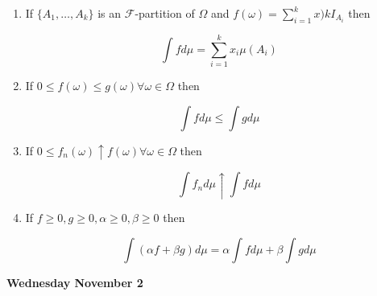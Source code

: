 \documentclass[11pt,fleqn]{book} %
\begin{document}
\begin{theorem}
	\begin{enumerate}
		\item If $\{A_1, \dots, A_k\}$ is an $\mathcal{F}$-partition of $\Omega$ and $f(\omega) = \sum^k_{i=1} x)k I_{A_i}$  then

				$$\int f d \mu = \sum^k_{i = 1} x_i \mu(A_i) $$
		
		\item If $0 \leq f(\omega) \leq g(\omega) \forall \omega\in \Omega$ then

				$$\int f d\mu \leq \int g d \mu $$ 
		\item If $0 \leq f_n(\omega) \uparrow f(\omega) \forall \omega \in \Omega$ then

				$$\int f_n d\mu \uparrow \int f d\mu $$ 
		\item If $f \geq 0, g \geq 0, \alpha \geq 0, \beta \geq 0$ then

				$$\int (\alpha f + \beta g)d\mu = \alpha \int f d\mu + \beta \int g d\mu $$
	\end{enumerate}
\end{theorem}

\textbf{Wednesday November 2}\\
\end{document}
